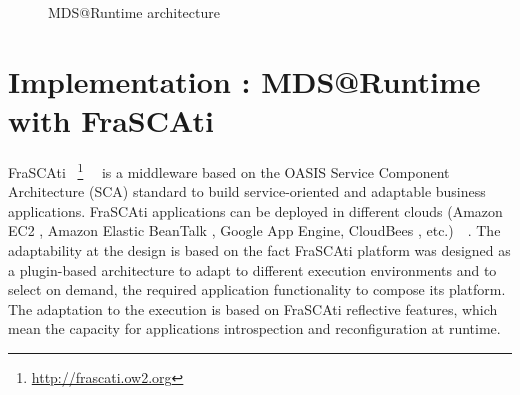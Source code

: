 \documentclass[runningheads,a4paper]{llncs}
\begin{document}
\begin{figure}
    \centering
    \caption{MDS@Runtime architecture}
    \label{fig :archi}
\end{figure}

\section{Implementation : MDS@Runtime with FraSCAti}


FraSCAti ~\footnote{\url{http://frascati.ow2.org}}~\cite{SMF09}~\cite{SMR12} is a middleware based on the OASIS Service Component Architecture (SCA) standard to build service-oriented and adaptable business applications. FraSCAti applications can be deployed in different clouds (Amazon EC2 , Amazon Elastic BeanTalk , Google App Engine, CloudBees , etc.)~\cite{MRS11}~\cite{PHM12}. The adaptability at the design is based on the fact FraSCAti platform was designed as a plugin-based architecture to adapt to different execution environments and to select on demand, the required application functionality to compose its platform. The adaptation to the execution is based on FraSCAti reflective features, which mean the capacity for applications introspection and reconfiguration at runtime. 
\end{document}
